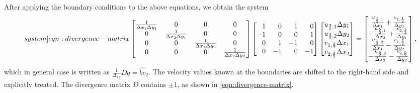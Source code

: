 \documentclass{article}
\numberwithin{equation}{section}
\begin{document}
After applying the boundary conditions to the above equations, we obtain the system
\begin{equation}\label[system]{eqn:divergence-matrix}
	\begin{bmatrix}{}
		\frac{1}{\Delta x_1\Delta y_1}		&0	&0	&0\\
		0		&\frac{1}{\Delta x_2\Delta y_1}	&0	&0\\
		0		&0	&\frac{1}{\Delta x_1\Delta y_2}	&0\\
		0		&0	&0	&\frac{1}{\Delta x_2\Delta y_2}
	\end{bmatrix}
	\begin{bmatrix*}[r]{}
		1	&0	&1	&0\\
		-1	&0	&0	&1\\
		0	&1	&-1	&0\\
		0	&-1	&0	&-1
	\end{bmatrix*}
	\begin{bmatrix}{}
	u_{\frac{3}{2},1}	\Delta y_1\\
	u_{\frac{3}{2},2}	\Delta y_2\\
	v_{1,\frac{3}{2}}	\Delta x_1\\
	v_{2,\frac{3}{2}}	\Delta x_2\\
	\end{bmatrix}
	=
	\begin{bmatrix}{}
	\frac{u_{\frac{1}{2},1}}{\Delta x_1}		+	\frac{v_{1,\frac{1}{2}}}{\Delta y_1}\\
	-\frac{u_{\frac{5}{2},1}}{\Delta x_2}	+ 	\frac{v_{2,\frac{1}{2}}}{\Delta y_1}\\
	\frac{u_{\frac{1}{2},2}}{\Delta x_1} 	-	\frac{v_{1,\frac{5}{2}}}{\Delta y_2}\\
	-\frac{u_{\frac{5}{2},2}}{\Delta x_2}		-\frac{v_{2,\frac{5}{2}}}{\Delta y_2}	
	\end{bmatrix},
\end{equation}
which in general case is written as 
$\frac{1}{\Delta_{xy}} D q=\hat{bc}_2$.
The velocity values known at the boundaries are shifted to the right-hand side and explicitly treated. The divergence matrix $D$ contains $\pm1$, as shown in \cref{eqn:divergence-matrix}.


\end{document}
